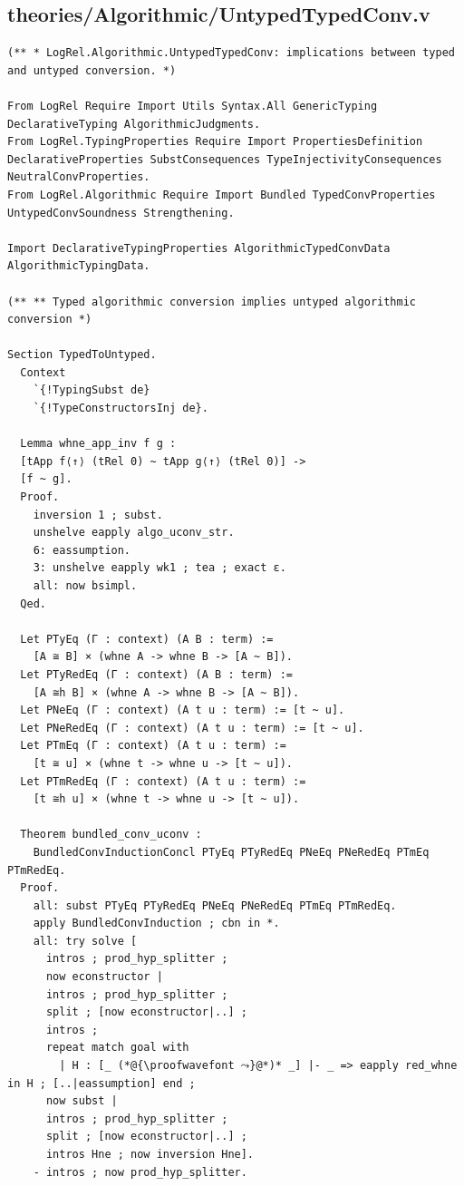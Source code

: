 \subsection*{theories/Algorithmic/UntypedTypedConv.v}
\begin{lstlisting}
(** * LogRel.Algorithmic.UntypedTypedConv: implications between typed and untyped conversion. *)

From LogRel Require Import Utils Syntax.All GenericTyping DeclarativeTyping AlgorithmicJudgments.
From LogRel.TypingProperties Require Import PropertiesDefinition DeclarativeProperties SubstConsequences TypeInjectivityConsequences NeutralConvProperties.
From LogRel.Algorithmic Require Import Bundled TypedConvProperties  UntypedConvSoundness Strengthening.

Import DeclarativeTypingProperties AlgorithmicTypedConvData AlgorithmicTypingData.

(** ** Typed algorithmic conversion implies untyped algorithmic conversion *)

Section TypedToUntyped.
  Context
    `{!TypingSubst de}
    `{!TypeConstructorsInj de}.

  Lemma whne_app_inv f g :
  [tApp f⟨↑⟩ (tRel 0) ~ tApp g⟨↑⟩ (tRel 0)] ->
  [f ~ g].
  Proof.
    inversion 1 ; subst.
    unshelve eapply algo_uconv_str.
    6: eassumption.
    3: unshelve eapply wk1 ; tea ; exact ε.
    all: now bsimpl.
  Qed.

  Let PTyEq (Γ : context) (A B : term) := 
    [A ≅ B] × (whne A -> whne B -> [A ~ B]).
  Let PTyRedEq (Γ : context) (A B : term) :=
    [A ≅h B] × (whne A -> whne B -> [A ~ B]).
  Let PNeEq (Γ : context) (A t u : term) := [t ~ u].
  Let PNeRedEq (Γ : context) (A t u : term) := [t ~ u].
  Let PTmEq (Γ : context) (A t u : term) :=
    [t ≅ u] × (whne t -> whne u -> [t ~ u]).
  Let PTmRedEq (Γ : context) (A t u : term) :=
    [t ≅h u] × (whne t -> whne u -> [t ~ u]).

  Theorem bundled_conv_uconv :
    BundledConvInductionConcl PTyEq PTyRedEq PNeEq PNeRedEq PTmEq PTmRedEq.
  Proof.
    all: subst PTyEq PTyRedEq PNeEq PNeRedEq PTmEq PTmRedEq.
    apply BundledConvInduction ; cbn in *.
    all: try solve [
      intros ; prod_hyp_splitter ; 
      now econstructor |
      intros ; prod_hyp_splitter ; 
      split ; [now econstructor|..] ;
      intros ;
      repeat match goal with
        | H : [_ (*@{\proofwavefont ⤳}@*)* _] |- _ => eapply red_whne in H ; [..|eassumption] end ;
      now subst |
      intros ; prod_hyp_splitter ; 
      split ; [now econstructor|..] ;
      intros Hne ; now inversion Hne].
    - intros ; now prod_hyp_splitter.


\end{lstlisting}
